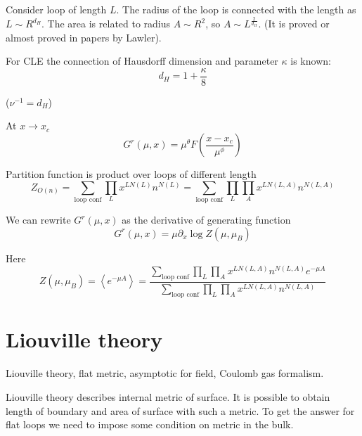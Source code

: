 \documentclass[12pt]{article}
\begin{document}
Consider loop of length $L$. The radius of the loop is connected with
the length as $L\sim R^{d_H}$. The area is related to radius $A\sim
R^2$, so $A\sim L^{\frac{2}{d_H}}$.
(It is proved or almost proved in papers by Lawler).

For CLE the connection of Hausdorff dimension and parameter $\kappa$
is known:
\begin{equation}
  \label{eq:5}
  d_H=1+\frac{\kappa}{8}
\end{equation}

($\nu^{-1}=d_H$)


At $x\to x_c$
\begin{equation}
  \label{eq:6}
  G^r(\mu,x)= \mu^{\theta} F\left(\frac{x-x_c}{\mu^{\phi}}\right)
\end{equation}

Partition function is product over loops of different length
\begin{equation}
  \label{eq:10}
  Z_{O(n)} = \sum_{\mbox{loop conf}} \prod_L x^{L N(L)} n^{N(L)} = \sum_{\mbox{loop conf}} \prod_L\prod_A x^{L N(L,A)} n^{N(L,A)}
\end{equation}


We can rewrite $G^r(\mu,x)$ as the derivative of generating function
\begin{equation}
  \label{eq:7}
  G^r(\mu,x)=\mu\partial_x \log Z(\mu,\mu_B)
\end{equation}

Here
\begin{equation}
  \label{eq:8}
  Z(\mu,\mu_B) = \left< e^{-\mu A} \right> = \frac{\sum_{\mbox{loop conf}}
  \prod_L\prod_A x^{L N(L,A)} n^{N(L,A)} e^{-\mu A}}{\sum_{\mbox{loop conf}} \prod_L\prod_A x^{L N(L,A)} n^{N(L,A)}}
\end{equation}



\section{Liouville theory}
\label{sec:liouville-theory}

Liouville theory, flat metric, asymptotic for field, Coulomb gas formalism.
\cite{nakayama2004liouville,ponsot2002boundary,teschner2001liouville,fateev2000boundary,teschner2000remarks,zamolodchikov1996conformal} 

Liouville theory describes internal metric of surface. It is possible to obtain length of boundary
and area of surface with such a metric. To get the answer for flat loops we need to impose some
condition on metric in the bulk. 
\end{document}
